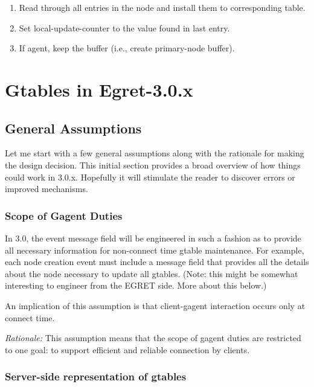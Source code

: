 \begin{enumerate}
\item Read through all entries in the node and install them to
  corresponding table.

\item Set local-update-counter to the value found in last entry.

\item If agent, keep the buffer (i.e., create primary-node buffer).
\end{enumerate}


\newpage
\section{Gtables in Egret-3.0.x}

\subsection{General Assumptions}

Let me start with a few general assumptions along with the rationale for
making the design decision.  This initial section provides a broad overview
of how things could work in 3.0.x.  Hopefully it will stimulate the reader to
discover errors or improved mechanisms.

\subsubsection*{Scope of Gagent Duties} 

In 3.0, the event message field will be engineered in such a fashion as to
provide all necessary information for non-connect time gtable maintenance.
For example, each node creation event must include a message field that
provides all the details about the node necessary to update all gtables.
(Note: this might be somewhat interesting to engineer from the EGRET side.
More about this below.)

An implication of this assumption is that client-gagent interaction occurs
only at connect time.

{\em Rationale:} This assumption means that the scope of gagent duties are
restricted to one goal: to support efficient and reliable connection by
clients.

\subsubsection*{Server-side representation of gtables}

